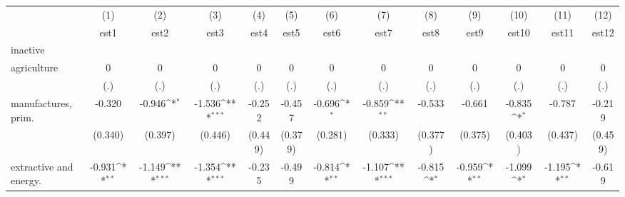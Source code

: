 {
\def\sym#1{\ifmmode^{#1}\else\(^{#1}\)\fi}
\begin{tabular}{l*{12}{c}}
\hline\hline
                    &\multicolumn{1}{c}{(1)}&\multicolumn{1}{c}{(2)}&\multicolumn{1}{c}{(3)}&\multicolumn{1}{c}{(4)}&\multicolumn{1}{c}{(5)}&\multicolumn{1}{c}{(6)}&\multicolumn{1}{c}{(7)}&\multicolumn{1}{c}{(8)}&\multicolumn{1}{c}{(9)}&\multicolumn{1}{c}{(10)}&\multicolumn{1}{c}{(11)}&\multicolumn{1}{c}{(12)}\\
                    &\multicolumn{1}{c}{est1}&\multicolumn{1}{c}{est2}&\multicolumn{1}{c}{est3}&\multicolumn{1}{c}{est4}&\multicolumn{1}{c}{est5}&\multicolumn{1}{c}{est6}&\multicolumn{1}{c}{est7}&\multicolumn{1}{c}{est8}&\multicolumn{1}{c}{est9}&\multicolumn{1}{c}{est10}&\multicolumn{1}{c}{est11}&\multicolumn{1}{c}{est12}\\
\hline
inactive            &                     &                     &                     &                     &                     &                     &                     &                     &                     &                     &                     &                     \\
agriculture         &           0         &           0         &           0         &           0         &           0         &           0         &           0         &           0         &           0         &           0         &           0         &           0         \\
                    &         (.)         &         (.)         &         (.)         &         (.)         &         (.)         &         (.)         &         (.)         &         (.)         &         (.)         &         (.)         &         (.)         &         (.)         \\
[1em]
manufactures, prim. &      -0.320         &      -0.946\sym{*}  &      -1.536\sym{***}&      -0.252         &      -0.457         &      -0.696\sym{*}  &      -0.859\sym{**} &      -0.533         &      -0.661         &      -0.835\sym{*}  &      -0.787         &      -0.219         \\
                    &     (0.340)         &     (0.397)         &     (0.446)         &     (0.449)         &     (0.379)         &     (0.281)         &     (0.333)         &     (0.377)         &     (0.375)         &     (0.403)         &     (0.437)         &     (0.459)         \\
[1em]
extractive and energy.&      -0.931\sym{**} &      -1.149\sym{***}&      -1.354\sym{***}&      -0.235         &      -0.499         &      -0.814\sym{**} &      -1.107\sym{***}&      -0.815\sym{*}  &      -0.959\sym{**} &      -1.099\sym{*}  &      -1.195\sym{**} &      -0.619         \\

\end{tabular}}
